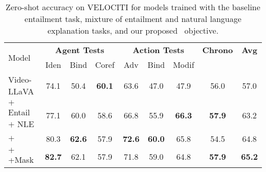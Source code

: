 \begin{table}[]
\centering
\footnotesize
\begin{tabular}{lccccccc>{\columncolor{gray!10}}c}
\toprule
\multirow{2}{*}{Model} & \multicolumn{3}{c}{\textbf{Agent Tests}}               & \multicolumn{3}{c}{\textbf{Action Tests}} & \textbf{Chrono} & \textbf{Avg} \\
& Iden          & Bind          & Coref         & Adv           & Bind          & Modif         &                         &                      \\
\midrule

\rowcolor[HTML]{F2F3F4} 
Video-LLaVA & 74.1 & 50.4 & \textbf{60.1} & 63.6 & 47.0 & 47.9 & 56.0 & 57.0  \\
\hdashline
\arrayrulecolor{black}
$+$ Entail $+$ NLE & 77.1 & 60.0 & 58.6 & 66.8 & 55.9 & \textbf{66.3} & \textbf{57.9} & 63.2 \\
$+$ \method{} & 80.3 & \textbf{62.6} & 57.9 & \textbf{72.6} & \textbf{60.0} & 65.8 & 54.5 & 64.8 \\
$+$ \method{}+Mask & \textbf{82.7} & 62.1 & 57.9 & 71.8 & 59.0 & 64.8 & \textbf{57.9} & \textbf{65.2} \\



\bottomrule
\end{tabular}
\caption{Zero-shot accuracy on VELOCITI for models trained with the baseline entailment task, mixture of entailment and natural language explanation tasks, and our proposed \method~objective.}
\label{table:nle}
\end{table}